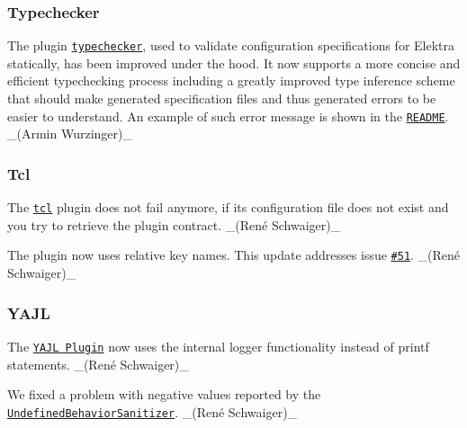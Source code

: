 \subsubsection*{Typechecker}


\begin{DoxyItemize}
\item The plugin \href{https://www.libelektra.org/plugins/typechecker}{\tt typechecker}, used to validate configuration specifications for Elektra statically, has been improved under the hood. It now supports a more concise and efficient typechecking process including a greatly improved type inference scheme that should make generated specification files and thus generated errors to be easier to understand. An example of such error message is shown in the \href{https://www.libelektra.org/plugins/typechecker}{\tt R\+E\+A\+D\+ME}. \+\_\+(\+Armin Wurzinger)\+\_\+
\end{DoxyItemize}

\subsubsection*{Tcl}


\begin{DoxyItemize}
\item The \href{http://libelektra.org/plugins/tcl}{\tt {\ttfamily tcl}} plugin does not fail anymore, if its configuration file does not exist and you try to retrieve the plugin contract. \+\_\+(René Schwaiger)\+\_\+
\item The plugin now uses relative key names. This update addresses issue \href{https://issues.libelektra.org/51}{\tt \#51}. \+\_\+(René Schwaiger)\+\_\+
\end{DoxyItemize}

\subsubsection*{Y\+A\+JL}


\begin{DoxyItemize}
\item The \href{http://libelektra.org/plugins/yajl}{\tt Y\+A\+JL Plugin} now uses the internal logger functionality instead of {\ttfamily printf} statements. \+\_\+(René Schwaiger)\+\_\+
\item We fixed a problem with negative values reported by the \href{https://clang.llvm.org/docs/UndefinedBehaviorSanitizer.html}{\tt Undefined\+Behavior\+Sanitizer}. \+\_\+(René Schwaiger)\+\_\+
\end{DoxyItemize}

